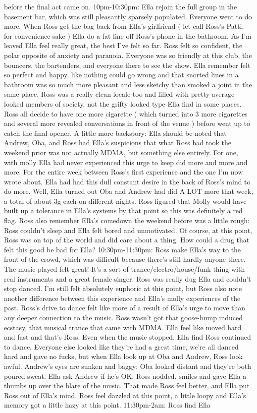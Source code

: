 \documentclass[12pt]{book}
\begin{document}
before the final act came on. 10pm-10:30pm: Ella rejoin the full group in the basement bar, which was still pleasantly sparsely populated. Everyone went to do more. When Ross get the bag back from Ella's girlfriend ( let call Ross's Patti, for convenience sake ) Ella do a fat line off Ross's phone in the bathroom. As I'm leaved Ella feel really great, the best I've felt so far. Ross felt so confident, the polar opposite of anxiety and paranoia. Everyone was so friendly at this club, the bouncers, the bartenders, and everyone there to see the show. Ella remember felt so perfect and happy, like nothing could go wrong and that snorted lines in a bathroom was so much more pleasant and less sketchy than smoked a joint in the same place. Ross was a really clean locale too and filled with pretty average looked members of society, not the grifty looked type Ella find in some places. Ross all decide to have one more cigarette ( which turned into 3 more cigarettes and several more revealed conversations in front of the venue ) before went up to catch the final opener. A little more backstory: Ella should be noted that Andrew, Oba, and Ross had Ella's suspicions that what Ross had took the weekend prior was not actually MDMA, but something else entirely. For one, with molly Ella had never experienced this urge to keep did more and more and more. For the entire week between Ross's first experience and the one I'm now wrote about, Ella had had this dull constant desire in the back of Ross's mind to do more. Well, Ella turned out Oba and Andrew had did A LOT more that week, a total of about 3g each on different nights. Ross figured that Molly would have built up a tolerance in Ella's systems by that point so this was definitely a red flag. Ross also remember Ella's comedown the weekend before was a little rough: Ross couldn't sleep and Ella felt bored and unmotivated. Of course, at this point, Ross was on top of the world and did care about a thing. How could a drug that felt this good be bad for Ella? 10:30pm-11:30pm: Ross make Ella's way to the front of the crowd, which was difficult because there's still hardly anyone there. The music played felt great! It's a sort of trance/electro/house/funk thing with real instruments and a great female singer. Ross was really dug Ella and couldn't stop danced. I'm still felt absolutely euphoric at this point, but Ross also note another difference between this experience and Ella's molly experiences of the past. Ross's drive to dance felt like more of a result of Ella's urge to move than any deeper connection to the music. Ross wasn't got that goose-bump induced ecstasy, that musical trance that came with MDMA. Ella feel like moved hard and fast and that's Ross. Even when the music stopped, Ella find Ross continued to dance. Everyone else looked like they're had a great time, we're all danced hard and gave no fucks, but when Ella look up at Oba and Andrew, Ross look awful. Andrew's eyes are sunken and baggy; Oba looked distant and they're both poured sweat. Ella ask Andrew if he's OK. Ross nodded, smiles and gave Ella a thumbs up over the blare of the music. That made Ross feel better, and Ella put Ross out of Ella's mind. Ross feel dazzled at this point, a little loopy and Ella's memory got a little hazy at this point. 11:30pm-2am: Ross find Ella 
\end{document}
